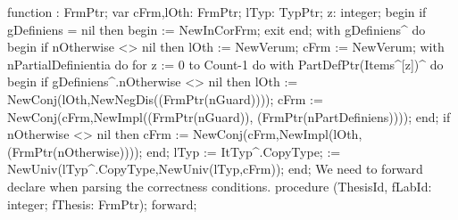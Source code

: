 function : FrmPtr;
var
   cFrm,lOth: FrmPtr;
   lTyp: TypPtr;
   z: integer;
begin
   if gDefiniens = nil then begin  := NewInCorFrm; exit end;
   with gDefiniens^ do
   begin
      if nOtherwise <> nil then lOth := NewVerum;
      cFrm := NewVerum;
      with nPartialDefinientia do
         for z := 0 to Count-1 do 
            with PartDefPtr(Items^[z])^ do
         begin
            if gDefiniens^.nOtherwise <> nil then
               lOth := NewConj(lOth,NewNegDis((FrmPtr(nGuard))));
            cFrm := NewConj(cFrm,NewImpl((FrmPtr(nGuard)),
                                         (FrmPtr(nPartDefiniens))));
         end;
      if nOtherwise <> nil then
         cFrm := NewConj(cFrm,NewImpl(lOth,(FrmPtr(nOtherwise))));
   end;
   lTyp := ItTyp^.CopyType;
    := NewUniv(lTyp^.CopyType,NewUniv(lTyp,cFrm));
end;
\eatline
{}\nwendcode{}\nwdocspar
We need to forward declare {\Tt{}\nwendquote} when parsing the correctness conditions.
\nwenddocs{}\endmoddef\nwstartdeflinemarkup\nwenddeflinemarkup
procedure (ThesisId, fLabId: integer; fThesis: FrmPtr); forward;

